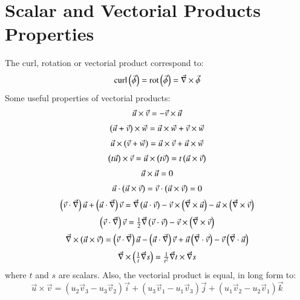 \documentclass{warpdoc}
\newcommand{\alb}{\vspace{0.2cm}\\} %
\begin{document}
\appendix





\section{Scalar and Vectorial Products Properties}

The curl, rotation or vectorial product correspond to:
%
\begin{displaymath}
      {\rm curl} \left(\vec{\phi} \right)
   =  {\rm rot} \left(\vec{\phi} \right)
   =  \vec{\nabla} \times \vec{\phi}
\end{displaymath}
%
Some useful properties of vectorial products:
%
\begin{displaymath}
 \begin{array}{c}
  \vec{u} \times \vec{v} = -\vec{v} \times \vec{u} \alb
  \left( \vec{u}+\vec{v}  \right)  \times \vec{w} = \vec{u} \times \vec{w} + \vec{v} \times \vec{w} \alb
  \vec{u} \times \left( \vec{v} + \vec{w} \right)  =  \vec{u} \times \vec{v} + \vec{u} \times \vec{w} \alb
  \left( t \vec{u} \right) \times \vec{v}  =  \vec{u} \times \left( t \vec{v} \right) = t \left( \vec{u} \times \vec{v}\right)\alb
  \vec{u} \times \vec{u}  =  0 \alb
  \vec{u} \cdot \left( \vec{u} \times \vec{v} \right) = \vec{v}\cdot\left( \vec{u} \times \vec{v} \right) = 0 \alb
  \left( \vec{v} \cdot \vec{\nabla} \right) \vec{u}
     + \left( \vec{u} \cdot \vec{\nabla} \right) \vec{v}  = 
        \vec{\nabla} \left( \vec{u} \cdot \vec{v} \right)
       -\vec{v} \times \left( \vec{\nabla} \times \vec{u} \right)
       -\vec{u} \times \left( \vec{\nabla} \times \vec{v} \right) \alb
  \left( \vec{v} \cdot \vec{\nabla} \right) \vec{v}  = 
        \frac{1}{2} \vec{\nabla} \left( \vec{v} \cdot \vec{v} \right)
       -\vec{v} \times \left( \vec{\nabla} \times \vec{v} \right) \alb
  \vec{\nabla} \times \left( \vec{u} \times \vec{v} \right)  = 
       \left( \vec{v} \cdot \vec{\nabla} \right) \vec{u}
      -\left( \vec{u} \cdot \vec{\nabla} \right) \vec{v}
      +\vec{u} \left( \vec{\nabla} \cdot \vec{v} \right)
      -\vec{v} \left( \vec{\nabla} \cdot \vec{u} \right) \alb
  \vec{\nabla} \times \left( \frac{1}{t} \vec{\nabla} s \right)
       = \frac{1}{t^2} \vec{\nabla}t \times \vec{\nabla}s
  \end{array}
\end{displaymath}
%
where $t$ and $s$ are scalars.
Also, the vectorial product is equal, in long form to:
%
\begin{displaymath}
  \vec{u} \times \vec{v}  =  \left( u_2 \vec{v}_3 - u_3 \vec{v}_2  \right)\vec{i}
                            +\left( u_3 \vec{v}_1 - u_1 \vec{v}_3  \right)\vec{j}
                            +\left( u_1 \vec{v}_2 - u_2 \vec{v}_1  \right)\vec{k}
\end{displaymath}
%
\end{document}
